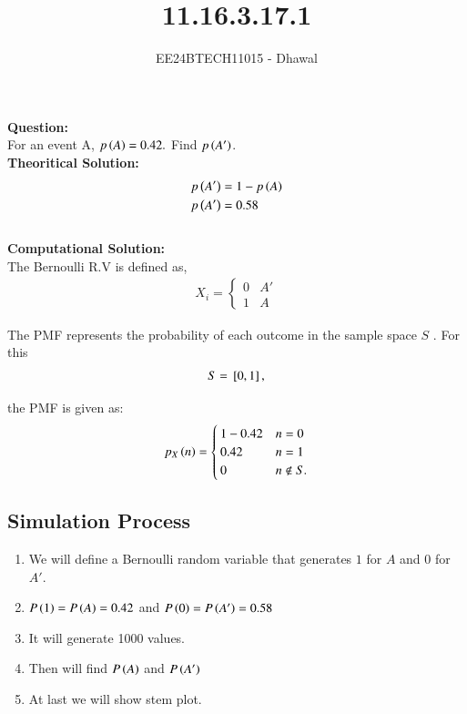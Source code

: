 \documentclass[journal]{IEEEtran}
\begin{document}

\vspace{3cm}

\title{11.16.3.17.1}
\author{EE24BTECH11015 - Dhawal}

{\let\newpage\relax\maketitle}

\renewcommand{\thefigure}{\theenumi}
\renewcommand{\thetable}{\theenumi}
\setlength{\intextsep}{10pt} %

\textbf{Question:}\\
For an event A, $p\left(A\right)=0.42.$ Find $p\left(A'\right)$.\\
	
	\textbf{Theoritical Solution:}
	\begin{align}
		p\left(A'\right)&=1-p\left(A\right)\\
        p\left(A'\right)&=0.58
	\end{align}\\
	\textbf{Computational Solution:}\\
	The Bernoulli R.V is defined as,
\begin{align}
	X_i = \begin{cases}
		0 & A'\\	
		1 & A	
	\end{cases}
\end{align}

    The PMF represents the probability of each outcome in the sample space $S$ . For this
\begin{align*}
    S = {}\left[0, 1\right],
\end{align*}

the PMF is given as:
\begin{align}
p_X\left(n\right) = \begin{cases}
    1-0.42 & n = 0\\
    0.42 & n = 1 \\ 
    0 & n \notin S.
\end{cases}
\end{align}

\subsection*{Simulation Process}
\begin{enumerate}
    \item We will define a Bernoulli random variable that generates $1$ for $A$ and $0$ for $A'$.
    \item $P\left(1\right)=P\left(A\right)=0.42$ and $P\left(0\right)=P\left(A'\right)=0.58$ 
    \item It will generate 1000 values.
    \item Then will find $P\left(A\right)$ and $P\left(A'\right)$
    \item At last we will show stem plot.
\end{enumerate}
\end{document}
